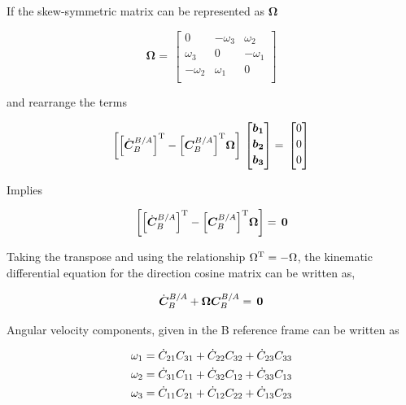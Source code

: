 If the skew-symmetric matrix can be represented as $\bm{\Omega}$

\begin{equation}\label{eqn:Qmatrix}
\bm{\Omega}
=\,
\begin{bmatrix}
0 & - \omega_3 & \omega_2 \\[0.3em]
\omega_3 & 0 & - \omega_1 \\[0.3em]
- \omega_2 & \omega_1 & 0\\[0.3em]
\end{bmatrix}
\end{equation}

and rearrange the terms

\begin{equation}{\label{eqn:C_dot_T_C_T_Omega}}
\bigg[\Big[{\dot{\bm{C}}_B^{B/A}}\Big]^{\rm T} - \Big[{\bm{C}_B^{B/A}}\Big]^{\rm T} \bm{\Omega} \bigg]
\,
\begin{bmatrix}
\bm{b_1}\\[0.2em]
\bm{b_2}\\[0.2em]
\bm{b_3}\\[0.2em]
\end{bmatrix}
 =\,
\begin{bmatrix}
0\\[0.2em]
0\\[0.2em]
0\\[0.2em]
\end{bmatrix}
\end{equation}

Implies

\begin{equation}{\label{eqn:C_dot_T_C_T_Omega2}}
\bigg[\Big[{\dot{\bm{C}}_B^{B/A}}\Big]^{\rm T} - \Big[{\bm{C}_B^{B/A}}\Big]^{\rm T} \bm{\Omega} \bigg]
 =\,
\bm{0}
\end{equation}

Taking the transpose and using the relationship $\Omega^{\rm T} = - \Omega$, 
the kinematic differential equation for the direction cosine matrix can be written as,

\begin{equation}{\label{eqn:kinematicEquDQM}}
{\dot{\bm{C}}_B^{B/A}} + \bm{\Omega} {\bm{C}_B^{B/A}}
 =\,
\bm{0}
\end{equation}

Angular velocity components, given in the B reference frame can be written as

\begin{align}{\label{eqn:angVelocityKinematics}}
\begin{split}
\omega_1 & = \dot{C}_{21} C_{31} + \dot{C}_{22} C_{32} + \dot{C}_{23} C_{33} \\
\omega_2 & = \dot{C}_{31} C_{11} + \dot{C}_{32} C_{12} + \dot{C}_{33} C_{13} \\
\omega_3 & = \dot{C}_{11} C_{21} + \dot{C}_{12} C_{22} + \dot{C}_{13} C_{23} \\
\end{split}
\end{align}

